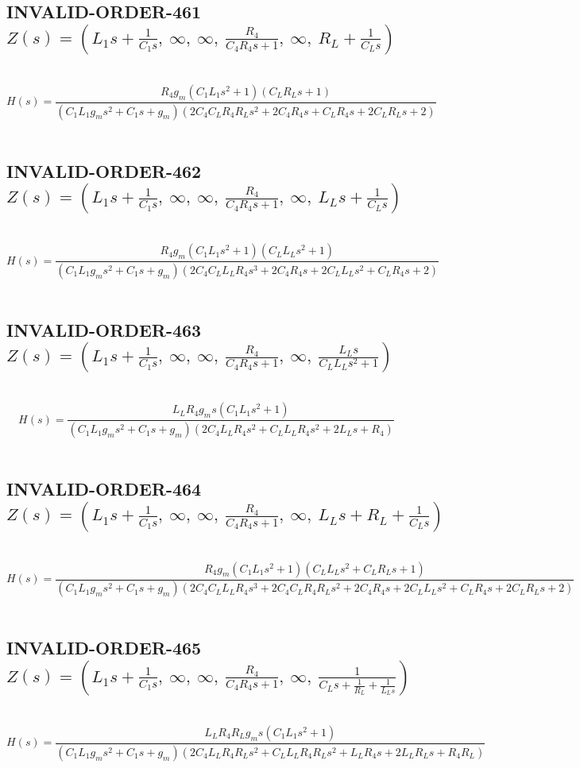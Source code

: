 \documentclass{article}
\begin{document}
\subsection{INVALID-ORDER-461 $Z(s) = \left( L_{1} s + \frac{1}{C_{1} s}, \  \infty, \  \infty, \  \frac{R_{4}}{C_{4} R_{4} s + 1}, \  \infty, \  R_{L} + \frac{1}{C_{L} s}\right)$ } \ 
\textbf{\[H(s) = \frac{R_{4} g_{m} \left(C_{1} L_{1} s^{2} + 1\right) \left(C_{L} R_{L} s + 1\right)}{\left(C_{1} L_{1} g_{m} s^{2} + C_{1} s + g_{m}\right) \left(2 C_{4} C_{L} R_{4} R_{L} s^{2} + 2 C_{4} R_{4} s + C_{L} R_{4} s + 2 C_{L} R_{L} s + 2\right)}\] } \ 
\subsection{INVALID-ORDER-462 $Z(s) = \left( L_{1} s + \frac{1}{C_{1} s}, \  \infty, \  \infty, \  \frac{R_{4}}{C_{4} R_{4} s + 1}, \  \infty, \  L_{L} s + \frac{1}{C_{L} s}\right)$ } \ 
\textbf{\[H(s) = \frac{R_{4} g_{m} \left(C_{1} L_{1} s^{2} + 1\right) \left(C_{L} L_{L} s^{2} + 1\right)}{\left(C_{1} L_{1} g_{m} s^{2} + C_{1} s + g_{m}\right) \left(2 C_{4} C_{L} L_{L} R_{4} s^{3} + 2 C_{4} R_{4} s + 2 C_{L} L_{L} s^{2} + C_{L} R_{4} s + 2\right)}\] } \ 
\subsection{INVALID-ORDER-463 $Z(s) = \left( L_{1} s + \frac{1}{C_{1} s}, \  \infty, \  \infty, \  \frac{R_{4}}{C_{4} R_{4} s + 1}, \  \infty, \  \frac{L_{L} s}{C_{L} L_{L} s^{2} + 1}\right)$ } \ 
\textbf{\[H(s) = \frac{L_{L} R_{4} g_{m} s \left(C_{1} L_{1} s^{2} + 1\right)}{\left(C_{1} L_{1} g_{m} s^{2} + C_{1} s + g_{m}\right) \left(2 C_{4} L_{L} R_{4} s^{2} + C_{L} L_{L} R_{4} s^{2} + 2 L_{L} s + R_{4}\right)}\] } \ 
\subsection{INVALID-ORDER-464 $Z(s) = \left( L_{1} s + \frac{1}{C_{1} s}, \  \infty, \  \infty, \  \frac{R_{4}}{C_{4} R_{4} s + 1}, \  \infty, \  L_{L} s + R_{L} + \frac{1}{C_{L} s}\right)$ } \ 
\textbf{\[H(s) = \frac{R_{4} g_{m} \left(C_{1} L_{1} s^{2} + 1\right) \left(C_{L} L_{L} s^{2} + C_{L} R_{L} s + 1\right)}{\left(C_{1} L_{1} g_{m} s^{2} + C_{1} s + g_{m}\right) \left(2 C_{4} C_{L} L_{L} R_{4} s^{3} + 2 C_{4} C_{L} R_{4} R_{L} s^{2} + 2 C_{4} R_{4} s + 2 C_{L} L_{L} s^{2} + C_{L} R_{4} s + 2 C_{L} R_{L} s + 2\right)}\] } \ 
\subsection{INVALID-ORDER-465 $Z(s) = \left( L_{1} s + \frac{1}{C_{1} s}, \  \infty, \  \infty, \  \frac{R_{4}}{C_{4} R_{4} s + 1}, \  \infty, \  \frac{1}{C_{L} s + \frac{1}{R_{L}} + \frac{1}{L_{L} s}}\right)$ } \ 
\textbf{\[H(s) = \frac{L_{L} R_{4} R_{L} g_{m} s \left(C_{1} L_{1} s^{2} + 1\right)}{\left(C_{1} L_{1} g_{m} s^{2} + C_{1} s + g_{m}\right) \left(2 C_{4} L_{L} R_{4} R_{L} s^{2} + C_{L} L_{L} R_{4} R_{L} s^{2} + L_{L} R_{4} s + 2 L_{L} R_{L} s + R_{4} R_{L}\right)}\] } \ 
\end{document}

